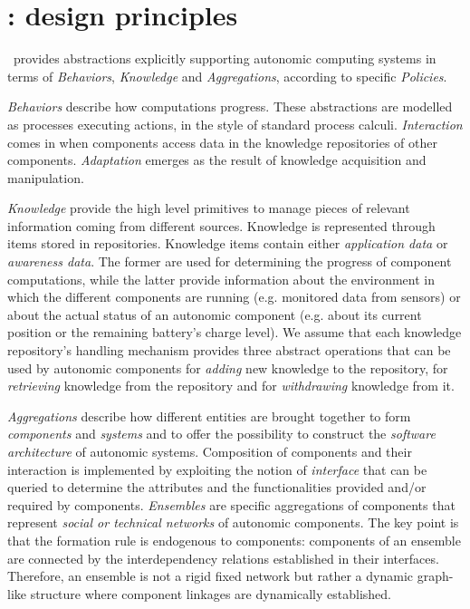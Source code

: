 \documentclass[11pt]{article}
\begin{document}
\section{\SCEL: design principles}
\label{sec:SCELtdesign}

\SCEL\ provides abstractions explicitly supporting autonomic computing systems in terms of \emph{Behaviors}, \emph{Knowledge} and \emph{Aggregations}, according to specific \emph{Policies}.

\emph{Behaviors} describe how computations progress. These abstractions are modelled as processes executing actions, in the style of standard process calculi. \emph{Interaction} comes in when components access data in the knowledge repositories of other components. \emph{Adaptation} emerges as the result of knowledge acquisition and manipulation.

\emph{Knowledge} provide the high level primitives to manage pieces of relevant information coming from different sources. Knowledge is represented through items stored in repositories. Knowledge items contain either \emph{application data} or \emph{awareness data}. The former are used for determining the progress of component computations, while the latter provide information about the environment in which the different components are running (e.g. monitored data from sensors) or about the actual status of an autonomic component (e.g. about its current position or the remaining battery's charge level). We assume that each knowledge repository's handling mechanism provides three abstract operations that can be used by autonomic components for \emph{adding} new knowledge to the repository, for \emph{retrieving} knowledge  from the repository and for \emph{withdrawing} knowledge from it.

\emph{Aggregations} describe how different entities are brought together to form \emph{components} and \emph{systems} and to offer the possibility to construct the \emph{software architecture} of autonomic systems. Composition of components and their interaction is implemented by exploiting the notion of \emph{interface} that can be queried to determine the attributes and the functionalities provided and/or required by components. \emph{Ensembles} are specific aggregations of components that represent \emph{social or technical networks} of autonomic components. The key point is that the formation rule is endogenous to components: components of an ensemble are connected by the interdependency relations established in their interfaces. Therefore, an ensemble is not a rigid fixed network but rather a dynamic graph-like structure where component linkages are dynamically established.
\end{document}

